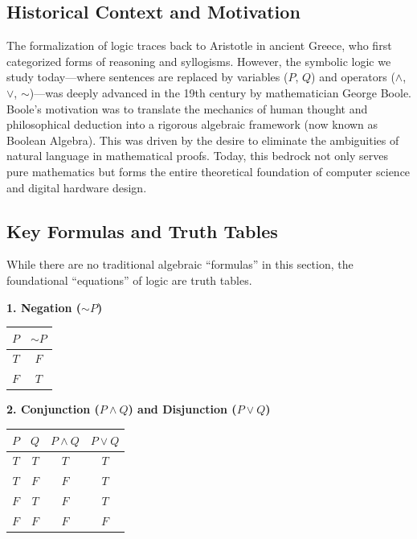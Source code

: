 \documentclass[11pt]{article}
\begin{document}
\subsection{Historical Context and Motivation}
The formalization of logic traces back to Aristotle in ancient Greece, who first categorized forms of reasoning and syllogisms. However, the symbolic logic we study today—where sentences are replaced by variables ($P$, $Q$) and operators ($\land$, $\lor$, $\sim$)—was deeply advanced in the 19th century by mathematician George Boole. Boole's motivation was to translate the mechanics of human thought and philosophical deduction into a rigorous algebraic framework (now known as Boolean Algebra). This was driven by the desire to eliminate the ambiguities of natural language in mathematical proofs. Today, this bedrock not only serves pure mathematics but forms the entire theoretical foundation of computer science and digital hardware design.

\subsection{Key Formulas and Truth Tables}
While there are no traditional algebraic ``formulas'' in this section, the foundational ``equations'' of logic are truth tables.

\textbf{1. Negation ($\sim P$)}
\begin{center}
\begin{tabular}{|c|c|}
\hline
$P$ & $\sim P$ \\
\hline
$T$ & $F$ \\
$F$ & $T$ \\
\hline
\end{tabular}
\end{center}

\textbf{2. Conjunction ($P \land Q$) and Disjunction ($P \lor Q$)}
\begin{center}
\begin{tabular}{|c|c|c|c|}
\hline
$P$ & $Q$ & $P \land Q$ & $P \lor Q$ \\
\hline
$T$ & $T$ & $T$ & $T$ \\
$T$ & $F$ & $F$ & $T$ \\
$F$ & $T$ & $F$ & $T$ \\
$F$ & $F$ & $F$ & $F$ \\
\hline
\end{tabular}
\end{center}
\end{document}
